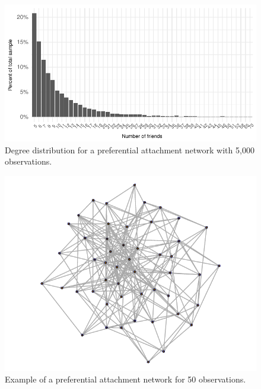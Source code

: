 \documentclass[english]{article}\usepackage[]{graphicx}\usepackage[]{color}
\makeatletter
\def\maxwidth{ %
  \ifdim\Gin@nat@width>\linewidth
    \linewidth
  \else
    \Gin@nat@width
  \fi
}
\newenvironment{knitrout}{}{} %
\theoremstyle{plain}
\theoremstyle{plain}
\makeatother
\begin{document}
\begin{knitrout}\footnotesize
{}\color{fgcolor}\begin{figure}[ht]

{\centering \includegraphics[width=\maxwidth]{TablesFigs/knitR-unnamed-chunk-11-1} 

}

\caption[Degree distribution for a preferential attachment network with 5,000 observations]{Degree distribution for a preferential attachment network with 5,000 observations.}\label{fig:unnamed-chunk-11}
\end{figure}


\end{knitrout}


\begin{knitrout}\footnotesize
{}\color{fgcolor}\begin{figure}[ht]

{\centering \includegraphics[width=\maxwidth]{TablesFigs/knitR-unnamed-chunk-12-1} 

}

\caption{Example of a preferential attachment network for 50 observations.\label{fig:netExamplePA}}\label{fig:unnamed-chunk-12}
\end{figure}


\end{knitrout}
\end{document}
